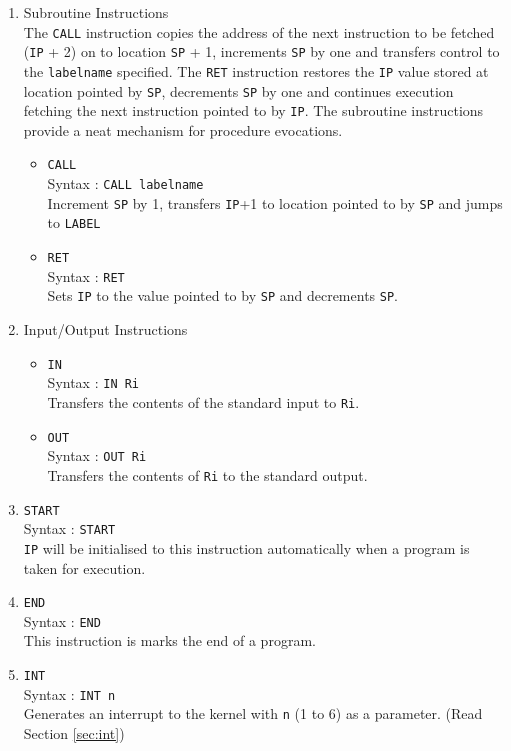 \documentclass[11pt]{article}
\begin{document}
\begin{enumerate}
\item Subroutine Instructions\\
The \texttt{CALL} instruction copies the address of the next instruction to be fetched (\texttt{IP} + 2) on to location \texttt{SP} + 1, increments \texttt{SP} by one and transfers control to the \texttt{labelname} specified. The \texttt{RET} instruction restores the \texttt{IP} value stored at location pointed by \texttt{SP}, decrements \texttt{SP} by one and continues execution fetching the next instruction pointed to by \texttt{IP}. The subroutine instructions provide a neat mechanism for procedure evocations.
\begin{itemize}
\item \texttt{CALL}\\
Syntax : \texttt{CALL labelname}\\
Increment \texttt{SP} by 1, transfers \texttt{IP}+1 to location pointed to by \texttt{SP} and jumps to \texttt{LABEL}
\item \texttt{RET}\\
Syntax : \texttt{RET}\\
Sets \texttt{IP} to the value pointed to by \texttt{SP} and decrements \texttt{SP}.
\end{itemize}

\item Input/Output Instructions
\begin{itemize}
\item \texttt{IN}\\
Syntax : \texttt{IN Ri}\\
Transfers the contents of the standard input to \texttt{Ri}.
\item \texttt{OUT}\\
Syntax : \texttt{OUT Ri}\\
Transfers the contents of \texttt{Ri} to the standard output.\\
\end{itemize}

\item \texttt{START}\\
Syntax : \texttt{START}\\
\texttt{IP} will be initialised to this instruction automatically when a program is taken for execution.
\item \texttt{END}\\
Syntax : \texttt{END}\\
This instruction is marks the end of a program.

\item \texttt{INT}\\
Syntax : \texttt{INT n}\\
Generates an interrupt to the kernel with \texttt{n} (1 to 6) as a parameter. (Read Section \ref{sec:int})
\end{enumerate}
\end{document}
